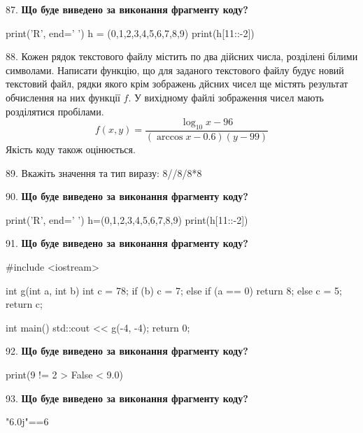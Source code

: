 \documentclass[11pt]{article}
\begin{document}
87. \textbf{Що буде виведено за виконання фрагменту коду?}

print('R', end=' ')
h = (0,1,2,3,4,5,6,7,8,9)
print(h[11::-2])

\par\vspace{5mm}

88. 
Кожен рядок текстового файлу містить по два дійсних числа, розділені білими символами.
Написати функцію, що для заданого текстового файлу будує новий текстовий файл, рядки якого крім зображень дйсних чисел ще містять результат обчислення на них функції $f$. У вихідному файлі зображення чисел мають розділятися пробілами. 
$$f(x, y) =\frac{\log_{10} x - 96}{(\arccos x - 0.6) (y - 99)}$$ 
Якість коду також оцінюється.

\par\vspace{5mm}

89. 
Вкажіть значення та тип виразу:
8//8/8*8
\par\vspace{5mm}

90. \textbf{Що буде виведено за виконання фрагменту коду?}

print('R', end=' ')
h=(0,1,2,3,4,5,6,7,8,9)
print(h[11::-2])

\par\vspace{5mm}

91. \textbf{Що буде виведено за виконання фрагменту коду?}

#include <iostream>

int g(int a, int b){
    int c = 78;
    if (b)
        c = 7;
    else if (a == 0)
         return 8;
    else 
        c = 5;
    return c;
}

int main(){
    std::cout << g(-4, -4);
    return 0;
}
\par\vspace{5mm}

92. \textbf{Що буде виведено за виконання фрагменту коду?}

print(9 != 2 > False < 9.0)
\par\vspace{5mm}

93. \textbf{Що буде виведено за виконання фрагменту коду?}

"6.0j"==6
\par\vspace{5mm}
\end{document}
